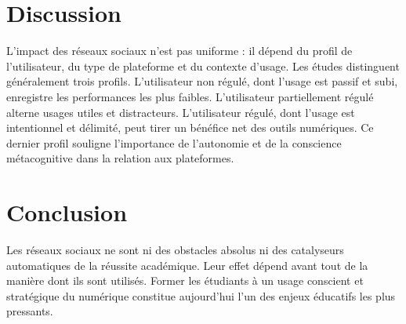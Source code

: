 \documentclass[12pt, a4paper]{article}
\begin{document}
\section{Discussion}

L'impact des réseaux sociaux n'est pas uniforme : il dépend du profil de l'utilisateur, du type de plateforme et du contexte d'usage. Les études distinguent généralement trois profils. L'utilisateur non régulé, dont l'usage est passif et subi, enregistre les performances les plus faibles. L'utilisateur partiellement régulé alterne usages utiles et distracteurs. L'utilisateur régulé, dont l'usage est intentionnel et délimité, peut tirer un bénéfice net des outils numériques. Ce dernier profil souligne l'importance de l'autonomie et de la conscience métacognitive dans la relation aux plateformes.

\section{Conclusion}

Les réseaux sociaux ne sont ni des obstacles absolus ni des catalyseurs automatiques de la réussite académique. Leur effet dépend avant tout de la manière dont ils sont utilisés. Former les étudiants à un usage conscient et stratégique du numérique constitue aujourd'hui l'un des enjeux éducatifs les plus pressants.
\end{document}
